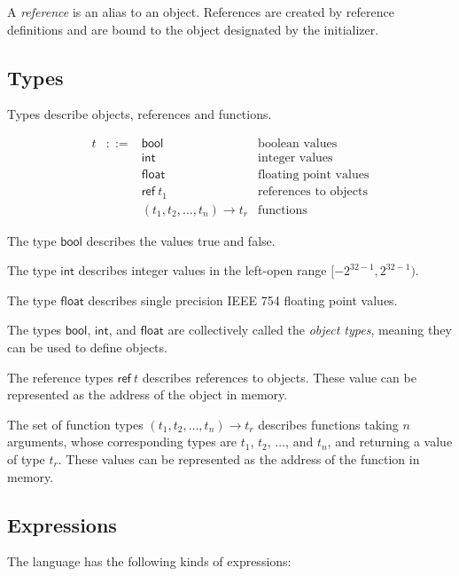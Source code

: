 \documentclass[11pt]{article}
\newcommand{\mathsc}[1]{\bm{\mathsf{#1}}}
\newcommand{\typebool}{\ensuremath{\mathsc{bool}}\xspace}
\newcommand{\typeint}{\ensuremath{\mathsc{int}}\xspace}
\newcommand{\typefloat}{\ensuremath{\mathsc{float}}\xspace}
\newcommand{\typeref}[1]{\ensuremath{\mathsc{ref}~#1}\xspace}
\newcommand{\typefn}[2]{\ensuremath{(#1)\rightarrow #2}\xspace}
\begin{document}
A \emph{reference} is an alias to an object. References are created by
reference definitions and are bound to the object designated by the initializer.

\subsection{Types}

Types describe objects, references and functions.

\[
\begin{array}{lcll}
t &::=& \typebool  & \text{boolean values} \\
  &   & \typeint   & \text{integer values} \\
  &   & \typefloat & \text{floating point values} \\
  &   & \typeref{t_1}   & \text{references to objects} \\
  &   & \typefn{t_1, t_2, \ldots, t_n}{t_r}
                   & \text{functions}
\end{array}
\]

The type \typebool describes the values true and false.

The type \typeint describes integer values in the left-open range $[-2^{32-1}, 2^{32-1})$.

The type \typefloat describes single precision IEEE 754 floating point values.

The types \typebool, \typeint, and \typefloat are collectively called the \emph{object types}, meaning they can be used to define objects.

The reference types \typeref{t} describes references to objects. 
These value can be represented as the address of the object in memory. 

The set of function types \typefn{t_1, t_2, \ldots, t_n}{t_r} describes
functions taking $n$ arguments, whose corresponding types are $t_1$, $t_2$, $\ldots$, and $t_n$, and returning a value of type $t_r$.
These values can be represented as the address of the function in memory.

\subsection{Expressions}

The language has the following kinds of expressions:
\end{document}
